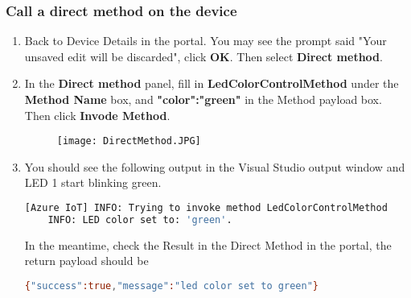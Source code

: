 \subsubsection{Call a direct method on the device}
\begin{enumerate}
    \item Back to Device Details in the portal. You may see the prompt said "Your unsaved edit will be discarded", click \textbf{OK}. Then select \textbf{Direct method}.
    \item In the \textbf{Direct method} panel, fill in \textbf{LedColorControlMethod} under the \textbf{Method Name} box, and \textbf{{"color":"green"}} in the Method payload box. Then click \textbf{Invode Method}.
    \begin{figure}[h]
        \centering
        \texttt{[image: DirectMethod.JPG]}
    \end{figure}
    \item You should see the following output in the Visual Studio output window and LED 1 start blinking green.
    \begin{lstlisting}[language=bash]
    [Azure IoT] INFO: Trying to invoke method LedColorControlMethod
    INFO: LED color set to: 'green'.
    \end{lstlisting}
    In the meantime, check the Result in the Direct Method in the portal, the return payload should be 
    \begin{lstlisting}[language=bash]
    {"success":true,"message":"led color set to green"}
    \end{lstlisting}
\end{enumerate}

